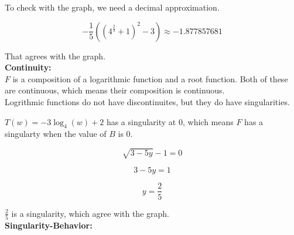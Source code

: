 \documentclass{ximera}
\begin{document}
To check with the graph, we need a decimal approximation.






\[
-\frac{1}{5} \left( \left( 4^{\tfrac{2}{3}} + 1 \right)^2 - 3 \right) \approx -1.877857681
\]


That agrees with the graph.\\



































\textbf{\textcolor{blue!55!black}{Continuity:}} \\


$F$ is a composition of a logarithmic function and a root function.  Both of these are continuous, which means their composition is continuous. \\

Logrithmic functions do not have discontinuites, but they do have singularities.  


$T(w) = -3 \log_4(w) + 2$ has a singularity at $0$, which means $F$ has a singularty when the value of $B$ is $0$.



\[
\sqrt{3 - 5y} - 1 = 0
\]



\[
3 - 5y = 1
\]



\[
y = \frac{2}{5}
\]

$\frac{2}{5}$ is a singularity, which agree with the graph. \\












\textbf{\textcolor{blue!55!black}{Singularity-Behavior:}} \\
\end{document}
